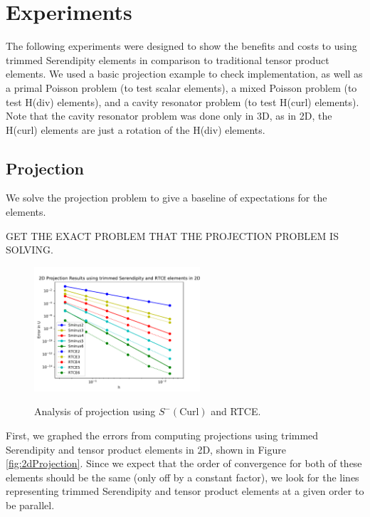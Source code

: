 \documentclass[manuscript,screen]{acmart}
\begin{document}
  \section{Experiments}
    
   The following experiments were designed to show the benefits and costs to using trimmed Serendipity elements in comparison to traditional tensor product elements.  We used a basic projection example to check implementation, as well as a primal Poisson problem (to test scalar elements), a mixed Poisson problem (to test H(div) elements), and a cavity resonator problem (to test H(curl) elements).  Note that the cavity resonator problem was done only in 3D, as in 2D, the H(curl) elements are just a rotation of the H(div) elements. 

\newpage
  \subsection{Projection}
  
  We solve the projection problem to give a baseline of expectations for the elements.  
  
  GET THE EXACT PROBLEM THAT THE PROJECTION PROBLEM IS SOLVING.

  \begin{figure}[h!]
    \caption{Analysis of projection using $S^-(\text{Curl})$ and RTCE.}
    \includegraphics[width=0.55\textwidth]{2dProjectionH.pdf}
    \label{fig:2dProjectionH}
  \end{figure}
  
  \noindent First, we graphed the errors from computing projections using trimmed Serendipity and tensor product elements in 2D, shown in Figure \ref{fig:2dProjection}.  Since we expect that the order of convergence for both of these elements should be the same (only off by a constant factor), we look for the lines representing trimmed Serendipity and tensor product elements at a given order to be parallel.
\end{document}
